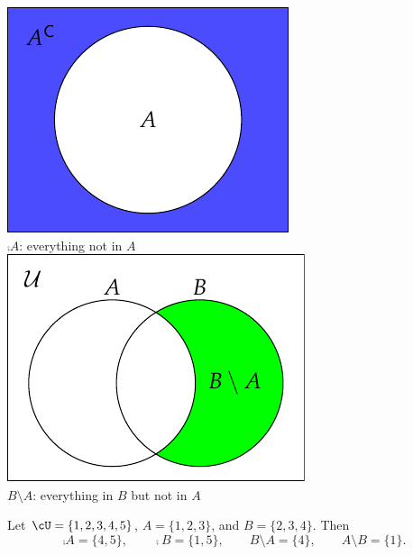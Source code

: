 \begin{minipage}{0.28\textwidth}\centering
\includegraphics[width=\textwidth]{sets-05-venncomp}\\
$\comp A$: everything not in $A$\\[20pt]
\includegraphics[width=\textwidth]{sets-06-vennrelcomp}\\
$B\setminus A$: everything in $B$ but not in $A$
\end{minipage}
\vspace{5pt}

\begin{example}
Let $\cU=\{1,2,3,4,5\}$, $A=\{1,2,3\}$, and $B=\{2,3,4\}$. Then
\[\comp A=\{4,5\},\qquad \comp B=\{1,5\},\qquad B\setminus A=\{4\},\qquad A\setminus B=\{1\}.\]
\end{example}
\vspace{3pt}


